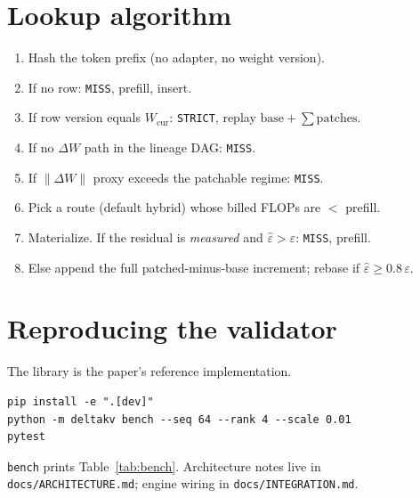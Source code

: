 \documentclass{article}
\begin{document}
\section{Lookup algorithm}
\label{app:lookup}

\begin{enumerate}[leftmargin=1.4em]
\item Hash the token prefix (no adapter, no weight version).
\item If no row: \texttt{MISS}, prefill, insert.
\item If row version equals $W_{\mathrm{cur}}$: \texttt{STRICT}, replay
      $\mathrm{base}+\sum\mathrm{patches}$.
\item If no $\Delta W$ path in the lineage DAG: \texttt{MISS}.
\item If $\|\Delta W\|$ proxy exceeds the patchable regime: \texttt{MISS}.
\item Pick a route (default hybrid) whose billed FLOPs are $<$ prefill.
\item Materialize. If the residual is \emph{measured} and
      $\hat\varepsilon>\varepsilon$: \texttt{MISS}, prefill.
\item Else append the full patched-minus-base increment; rebase if
      $\hat\varepsilon\ge 0.8\,\varepsilon$.
\end{enumerate}

\section{Reproducing the validator}
\label{app:repro}

The library is the paper's reference implementation.
\begin{verbatim}
pip install -e ".[dev]"
python -m deltakv bench --seq 64 --rank 4 --scale 0.01
pytest
\end{verbatim}
\texttt{bench} prints Table~\ref{tab:bench}.
Architecture notes live in \texttt{docs/ARCHITECTURE.md}; engine wiring
in \texttt{docs/INTEGRATION.md}.
\end{document}
